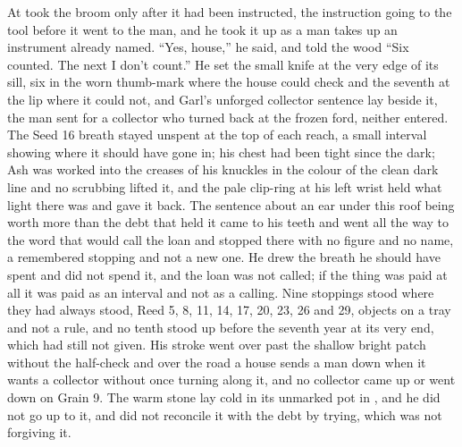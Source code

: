 At   took the broom only after it had been instructed, the instruction going to the tool before it went to the man, and he took it up as a man takes up an instrument already named. “Yes, house,” he said, and told the wood “Six counted. The next I don't count.” He set the small knife at the very edge of its sill, six in the worn thumb-mark where the house could check and the seventh at the lip where it could not, and Garl's unforged collector sentence lay beside it, the man sent for a collector who turned back at the frozen ford, neither entered. The Seed 16 breath stayed unspent at the top of each reach, a small interval showing where it should have gone in; his chest had been tight since the dark; Ash was worked into the creases of his knuckles in the colour of the clean dark line and no scrubbing lifted it, and the pale clip-ring at his left wrist held what light there was and gave it back. The sentence about an ear under this roof being worth more than the debt that held it came to his teeth and went all the way to the word that would call the loan and stopped there with no figure and no name, a remembered stopping and not a new one. He drew the breath he should have spent and did not spend it, and the loan was not called; if the thing was paid at all it was paid as an interval and not as a calling. Nine stoppings stood where they had always stood, Reed 5, 8, 11, 14, 17, 20, 23, 26 and 29, objects on a tray and not a rule, and no tenth stood up before the seventh year at its very end, which had still not given. His stroke went over  past the shallow bright patch without the half-check and over the road a house sends a man down when it wants a collector without once turning along it, and no collector came up or went down  on Grain 9. The warm stone lay cold in its unmarked pot in , and he did not go up to it, and did not reconcile it with the debt by trying, which was not forgiving it.

\scenebreak

